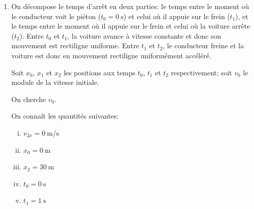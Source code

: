 \begin{enumerate}[a]
  \begin{marginfigure}
  \end{marginfigure}
  \item On décompose le temps d'arrêt en deux parties: le temps entre le moment
    où le conducteur voit le piéton ($t_0 = \SI{0}{\second}$) et celui où il
    appuie sur le frein ($t_1$), et le temps entre le moment où il appuie sur
    le frein et celui où la voiture arrête ($t_2$).  Entre $t_0$ et $t_1$, la
    voiture avance à vitesse constante et donc son mouvement est rectiligne
    uniforme.  Entre $t_1$ et $t_2$, le conducteur freine et la voiture est
    donc en mouvement rectiligne uniformément accéléré.

    Soit $x_0$, $x_1$ et $x_2$ les positions aux temps $t_0$, $t_1$ et $t_2$
    respectivement; soit $v_0$ le module de la vitesse initiale.  

    On cherche $v_{0}$.

    On connaît les quantités suivantes:
    \begin{enumerate}[i.]
      \item $v_{2x} = \SI{0}{\meter\per\second}$
      \item $x_0 = \SI{0}{\meter}$
      \item $x_2 = \SI{30}{\meter}$
      \item $t_0 = \SI{0}{\second}$
      \item $t_1 = \SI{1}{\second}$
    \end{enumerate}


\end{enumerate}
